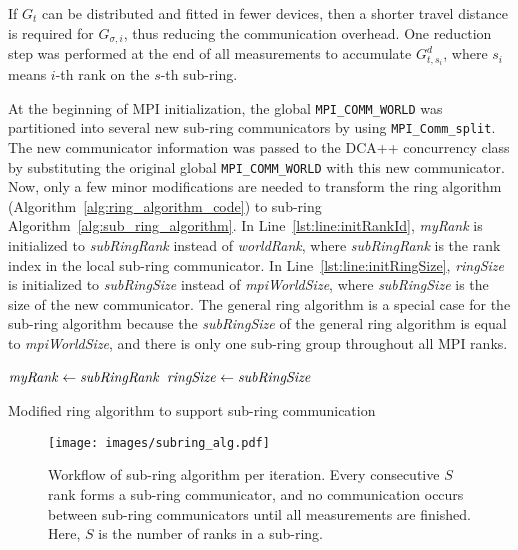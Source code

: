 If $G_t$ can be distributed and fitted in fewer devices, then a shorter travel distance is required 
for $G_{\sigma,i}$, thus reducing the communication overhead. One reduction
step was performed at the end of all measurements to accumulate $G^d_{t,s_i}$, 
where $s_i$ means $i$-th rank on the $s$-th sub-ring.

At the beginning of MPI initialization, the global \mbox{\texttt{MPI\_COMM\_WORLD}} was partitioned  into several new sub-ring communicators by using \mbox{\texttt{MPI\_Comm\_split}}. 
The new
communicator information was passed to the DCA++ concurrency class by substituting the original global 
\mbox{\texttt{MPI\_COMM\_WORLD}} with this new communicator. Now, only a few minor modifications
are needed to transform the ring algorithm (Algorithm~\ref{alg:ring_algorithm_code})
to sub-ring Algorithm~\ref{alg:sub_ring_algorithm}. In Line~\ref{lst:line:initRankId}, \textit{myRank} is 
initialized to \textit{subRingRank} instead of \textit{worldRank}, where 
\textit{subRingRank} is the rank index in the local sub-ring communicator. 
%
In Line~\ref{lst:line:initRingSize}, \textit{ringSize} is initialized to \textit{subRingSize}
instead of \textit{mpiWorldSize}, where \textit{subRingSize} is the
size of the new communicator.
%
The general ring algorithm is a special case for the sub-ring algorithm because the
\textit{subRingSize} of the general ring algorithm is equal to \textit{mpiWorldSize}, and
there is only one sub-ring group throughout all MPI ranks.


\LinesNumberedHidden
\begin{algorithm}
    {$\mbox{\textit{myRank}} \leftarrow \mbox{\textit{subRingRank}}$}\;         
    {$\mbox{\textit{ringSize}} \leftarrow \mbox{\textit{subRingSize}}$}\;      
\caption{Modified ring algorithm to support sub-ring communication}
\label{alg:sub_ring_algorithm}
\end{algorithm}


\begin{figure}
	\centering
	\texttt{[image: images/subring\_alg.pdf]}
	\caption{Workflow of sub-ring algorithm per iteration. Every consecutive $S$ rank forms a sub-ring communicator, 
	and no communication occurs between sub-ring communicators until all measurements are finished. Here, $S$ is the number of ranks in a sub-ring.}
	\label{fig:subring_algorithm_figure}
\end{figure}

